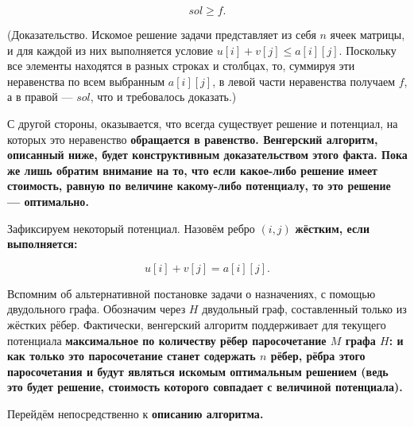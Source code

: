 $$ sol \ge f. $$

(Доказательство. Искомое решение задачи представляет из себя $n$ ячеек матрицы, и для каждой из них выполняется условие $u[i] + v[j] \le a[i][j]$. Поскольку все элементы находятся в разных строках и столбцах, то, суммируя эти неравенства по всем выбранным $a[i][j]$, в левой части неравенства получаем $f$, а в правой --- $sol$, что и требовалось доказать.)

С другой стороны, оказывается, что всегда существует решение и потенциал, на которых это неравенство \bf{обращается в равенство}. Венгерский алгоритм, описанный ниже, будет конструктивным доказательством этого факта. Пока же лишь обратим внимание на то, что если какое-либо решение имеет стоимость, равную по величине какому-либо потенциалу, то это решение --- \bf{оптимально}.

Зафиксируем некоторый потенциал. Назовём ребро $(i,j)$ \bf{жёстким}, если выполняется:

$$ u[i] + v[j] = a[i][j]. $$

Вспомним об альтернативной постановке задачи о назначениях, с помощью двудольного графа. Обозначим через $H$ двудольный граф, составленный только из жёстких рёбер. Фактически, венгерский алгоритм поддерживает для текущего потенциала \bf{максимальное по количеству рёбер паросочетание $M$} графа $H$: и как только это паросочетание станет содержать $n$ рёбер, рёбра этого паросочетания и будут являться искомым оптимальным решением (ведь это будет решение, стоимость которого совпадает с величиной потенциала).

Перейдём непосредственно к \bf{описанию алгоритма}.

